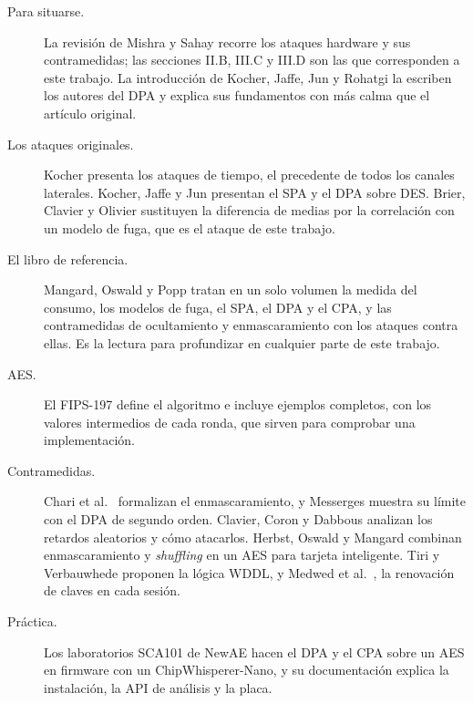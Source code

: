 \begin{description}
  \item[Para situarse.] La revisión de Mishra y Sahay
    \cite{mishra2025modern} recorre los ataques hardware y sus contramedidas;
    las secciones II.B, III.C y III.D son las que corresponden a este trabajo.
    La introducción de Kocher, Jaffe, Jun y Rohatgi \cite{kocher2011intro} la
    escriben los autores del DPA y explica sus fundamentos con más calma que el
    artículo original.
  \item[Los ataques originales.] Kocher \cite{kocher1996timing} presenta los
    ataques de tiempo, el precedente de todos los canales laterales. Kocher,
    Jaffe y Jun \cite{kocher1999dpa} presentan el SPA y el DPA sobre DES.
    Brier, Clavier y Olivier \cite{brier2004cpa} sustituyen la diferencia de
    medias por la correlación con un modelo de fuga, que es el ataque de este
    trabajo.
  \item[El libro de referencia.] Mangard, Oswald y Popp
    \cite{mangard2007power} tratan en un solo volumen la medida del consumo,
    los modelos de fuga, el SPA, el DPA y el CPA, y las contramedidas de
    ocultamiento y enmascaramiento con los ataques contra ellas. Es la lectura
    para profundizar en cualquier parte de este trabajo.
  \item[AES.] El FIPS-197 \cite{nist2023fips197} define el algoritmo e
    incluye ejemplos completos, con los valores intermedios de cada ronda, que
    sirven para comprobar una implementación.
  \item[Contramedidas.] Chari et al.\ \cite{chari1999masking} formalizan el
    enmascaramiento, y Messerges \cite{messerges2000second} muestra su límite
    con el DPA de segundo orden. Clavier, Coron y Dabbous
    \cite{clavier2000countermeasures} analizan los retardos aleatorios y cómo
    atacarlos. Herbst, Oswald y Mangard \cite{herbst2006aes} combinan
    enmascaramiento y \emph{shuffling} en un AES para tarjeta inteligente.
    Tiri y Verbauwhede \cite{tiri2004wddl} proponen la lógica WDDL, y Medwed
    et al.\ \cite{medwed2010fresh}, la renovación de claves en cada sesión.
  \item[Práctica.] Los laboratorios SCA101 de NewAE
    \cite{cw-lab-dpa,cw-lab-cpa} hacen el DPA y el CPA sobre un AES en
    firmware con un ChipWhisperer-Nano, y su documentación
    \cite{cw-getting-started,cw-analyzer-api,cw-nano-docs} explica la
    instalación, la API de análisis y la placa.
\end{description}
